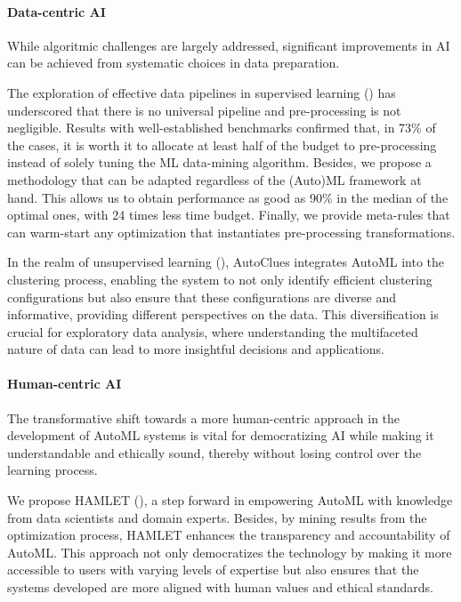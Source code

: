 \paragraph{Data-centric AI}
While algoritmic challenges are largely addressed, significant improvements in AI can be achieved from systematic choices in data preparation.

The exploration of effective data pipelines in supervised learning () has underscored that there is no universal pipeline and pre-processing is not negligible.
Results with well-established benchmarks confirmed that, in 73\% of the cases, it is worth it to allocate at least half of the budget to pre-processing instead of solely tuning the ML data-mining algorithm.
Besides, we propose a methodology that can be adapted regardless of the (Auto)ML framework at hand.
This allows us to obtain performance as good as 90\% in the median of the optimal ones, with 24 times less time budget.
Finally, we provide meta-rules that can warm-start any optimization that instantiates pre-processing transformations.

In the realm of unsupervised learning (), AutoClues integrates AutoML into the clustering process, enabling the system to not only identify efficient clustering configurations but also ensure that these configurations are diverse and informative, providing different perspectives on the data.
This diversification is crucial for exploratory data analysis, where understanding the multifaceted nature of data can lead to more insightful decisions and applications.

\paragraph{Human-centric AI}
The transformative shift towards a more human-centric approach in the development of AutoML systems is vital for democratizing AI while making it understandable and ethically sound, thereby without losing control over the learning process.

We propose HAMLET (), a step forward in empowering AutoML with knowledge from data scientists and domain experts.
Besides, by mining results from the optimization process, HAMLET enhances the transparency and accountability of AutoML.
This approach not only democratizes the technology by making it more accessible to users with varying levels of expertise but also ensures that the systems developed are more aligned with human values and ethical standards.

